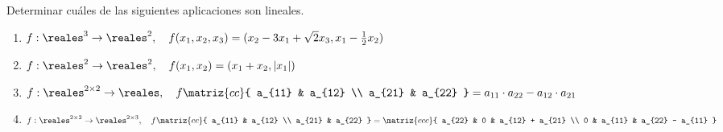 \begin{enunciado}{\ejercicio}
  Determinar cuáles de las siguientes aplicaciones son lineales.
  \begin{enumerate}[label=(\alph*)]
    \item $f: \reales^3 \to \reales^2,\quad f(x_1, x_2, x_3) = (x_2 - 3x_1 + \sqrt{2}x_3, x_1 - \frac{1}{2} x_2)$

    \item $f: \reales^2 \to \reales^2,\quad f(x_1, x_2) = (x_1 + x_2, |x_1|)$

    \item $f: \reales^{2 \times 2} \to \reales,\quad
            f \matriz{cc}{
              a_{11} & a_{12} \\
              a_{21} & a_{22}
            }
            =
            a_{11} \cdot a_{22} - a_{12} \cdot a_{21}
          $

    \item $f: \reales^{2 \times 2} \to \reales^{2 \times 3},\quad
            f
            \matriz{cc}{
              a_{11} & a_{12} \\
              a_{21} & a_{22}
            }
            =
            \matriz{ccc}{
              a_{22} & 0 & a_{12} + a_{21} \\
              0 & a_{11} & a_{22} - a_{11}
            }
          $
  \end{enumerate}
\end{enunciado}

